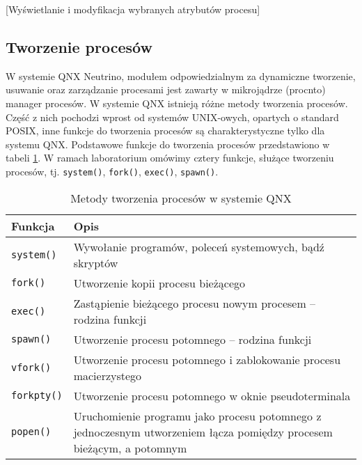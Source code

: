 \begin{example}{[Wyświetlanie i modyfikacja wybranych atrybutów procesu]}
  \label{ex:TEPBG}
  
\end{example}


\subsection{Tworzenie procesów}

W systemie QNX Neutrino, modułem odpowiedzialnym za dynamiczne tworzenie,
usuwanie oraz zarządzanie procesami jest zawarty w mikrojądrze (procnto)
manager procesów. W systemie QNX istnieją różne metody tworzenia procesów.
Część z nich pochodzi wprost od systemów UNIX-owych, opartych o standard POSIX,
inne funkcje do tworzenia procesów są charakterystyczne tylko dla systemu QNX.
Podstawowe funkcje do tworzenia procesów przedstawiono w tabeli
\ref{tab:IMJR3}. W ramach laboratorium omówimy cztery funkcje, służące
tworzeniu procesów, tj. \texttt{system()}, \texttt{fork()}, \texttt{exec()},
\texttt{spawn()}.

\begin{table}[h!]
  \centering
  \caption{Metody tworzenia procesów w systemie QNX}
  \label{tab:IMJR3}
  \begin{tabular}{|l|p{}|}
    \hline
    \textbf{Funkcja}    & \textbf{Opis}  \\ \hline
    \texttt{system()}   & Wywołanie programów, poleceń systemowych, bądź skryptów \\ \hline
    \texttt{fork()}     & Utworzenie kopii procesu bieżącego \\ \hline
    \texttt{exec()}     & Zastąpienie bieżącego procesu nowym procesem -- rodzina funkcji \\ \hline
    \texttt{spawn()}    & Utworzenie procesu potomnego -- rodzina funkcji \\ \hline
    \texttt{vfork()}    & Utworzenie procesu potomnego i zablokowanie procesu macierzystego \\ \hline
    \texttt{forkpty()}  & Utworzenie procesu potomnego w oknie pseudoterminala \\ \hline
    \texttt{popen()}    & Uruchomienie programu jako procesu potomnego z
                          jednoczesnym utworzeniem łącza pomiędzy procesem
                          bieżącym, a potomnym \\ \hline
  \end{tabular}
\end{table}

